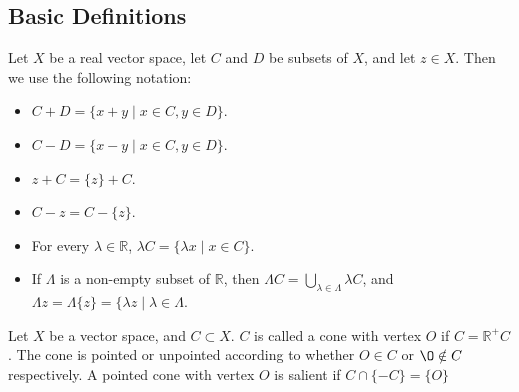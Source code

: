 


\subsection{Basic Definitions}

\begin{definition}
	\label{def0. Sets}
Let $X$ be a real  vector space, let $C$ and $D$ be subsets of $X$, and let $z \in X$. Then we use the following notation:
\begin{itemize}
	\item $C + D =\lbrace x + y \mid x \in C, y \in D\rbrace$.
	\item $C -D =\lbrace x - y \mid x \in C, y \in D\rbrace$.
	\item $z+C=\lbrace z \rbrace +C$.
	\item  $C-z=C-\lbrace z \rbrace$. 
	\item For every $\lambda \in \mathbb{R}$, $\lambda C =\lbrace\lambda x \mid x \in C\rbrace$.
	\item  If $\Lambda$ is a non-empty subset of $\mathbb{R}$, then $\Lambda C = \bigcup_{\lambda \in \Lambda}\lambda C$, and $\Lambda z = \Lambda \lbrace z \rbrace =\lbrace\lambda z \mid \lambda \in \Lambda$.
\end{itemize}
\end{definition}

 

\begin{definition}[Cone]
	Let $X$ be a vector space, and $C \subset X$. $C$ is called a cone with vertex $O$ if $C=\mathbb{R}^+C$. The cone is pointed or unpointed according to whether $O \in C$ or $\O \notin C$ respectively. A pointed cone with vertex  $O$ is salient if $C \cap \{-C\} = \{O\}$
\end{definition}


